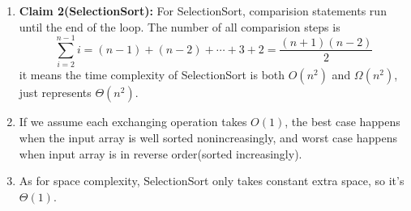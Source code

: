 \documentclass[12pt,a4paper]{article}
\makeatletter
\newtheorem*{solution}{Solution}
\theoremstyle{definition}
\renewenvironment{solution}[1][Solution] {\par\pushQED{\qed}\normalfont\topsep6\p@\@plus6\p@\relax\trivlist\item[\hskip\labelsep\bfseries#1\@addpunct{.}]\ignorespaces}{\popQED\endtrivlist\@endpefalse} \makeatother
\makeatother
\begin{document}
\begin{enumerate}
\begin{solution}
        \textbf{Claim 2(SelectionSort):} For SelectionSort, comparision statements run until the end of the loop. 
        The number of all comparision steps is $$\sum_{i=2}^{n-1} i = (n-1)+(n-2)+\cdots +3+2 = \frac{(n+1)(n-2)}{2}$$
        it means the time complexity of SelectionSort is both $O(n^2)$ and $\Omega(n^2)$,  just represents $\Theta(n^2)$. 
        \item If we assume each exchanging operation takes $O(1)$, the best case happens when the input array is well sorted nonincreasingly, and worst case happens when input array is in reverse order(sorted increasingly).
        \item As for space complexity, SelectionSort only takes constant extra space, so it's $\Theta(1)$.
    \end{solution}


\end{enumerate}
\end{document}
